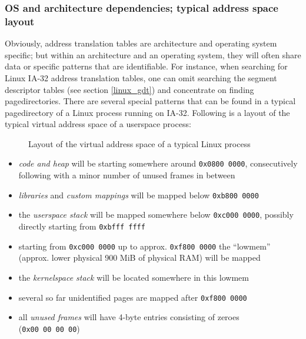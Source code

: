 \subsubsection{OS and architecture dependencies; typical address space layout}

\label{ATTguess} Obviously, address translation tables are architecture and
operating system specific; but within an architecture and an operating system,
they will often share data or specific patterns that are identifiable. For
instance, when searching for Linux IA-32 address translation tables, one can
omit searching the segment descriptor tables (see section \ref{linux_gdt}) and
concentrate on finding pagedirectories. There are several special patterns that
can be found in a typical pagedirectory of a Linux process running on IA-32.
Following is a layout of the typical virtual address space of a userspace
process:

\begin{figure}[ht] \begin{center}

	\epsfysize 9.5cm


	\caption{Layout of the virtual address space of a typical Linux process}

	\label{fig:linux_virtual_address_space}

\end{center}\end{figure}


\begin{itemize}

	\item \emph{code and heap} will be starting somewhere around
		\texttt{0x0800~0000}, consecutively following with a minor
		number of unused frames in between

	\item \emph{libraries} and \emph{custom mappings} will be mapped below
		\texttt{0xb800~0000}

	\item the \emph{userspace stack} will be mapped somewhere below
		\texttt{0xc000~0000}, possibly directly starting from
		\texttt{0xbfff~ffff}

	\item starting from \texttt{0xc000~0000} up to approx\@.
		\texttt{0xf800~0000} the ``lowmem'' (approx\@. lower physical
		900 MiB of physical RAM) will be mapped

	\item the \emph{kernelspace stack} will be located somewhere in this
		lowmem

	\item several so far unidentified pages are mapped after
		\texttt{0xf800~0000}

	\item all \emph{unused frames} will have 4-byte entries consisting of
		zeroes (\texttt{0x00~00~00~00})

\end{itemize}

